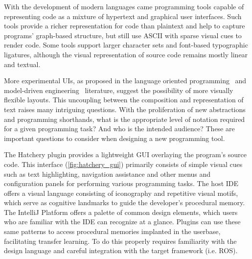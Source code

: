 With the development of modern languages came programming tools capable of representing code as a mixture of hypertext and graphical user interfaces. Such tools provide a richer representation for code than plaintext and help to capture programs' graph-based structure, but still use ASCII with sparse visual cues to render code. Some tools support larger character sets and font-based typographic ligatures, although the visual representation of source code remains mostly linear and textual.

More experimental UIs, as proposed in the language oriented programming~\citep{dmitriev2004language} and model-driven engineering~\citep{famelis2015mummint} literature, suggest the possibility of more visually flexible layouts. This uncoupling between the composition and representation of text raises many intriguing questions. With the proliferation of new abstractions and programming shorthands, what is the appropriate level of notation required for a given programming task? And who is the intended audience? These are important questions to consider when designing a new programming tool.

The Hatchery plugin provides a lightweight GUI overlaying the program's source code. This interface (\autoref{fig:hatchery_gui}) primarily consists of simple visual cues such as text highlighting, navigation assistance and other menus and configuration panels for performing various programming tasks. The host IDE offers a visual language consisting of iconography and repetitive visual motifs, which serve as cognitive landmarks to guide the developer's procedural memory. The IntelliJ Platform offers a palette of common design elements, which users who are familiar with the IDE can recognize at a glance. Plugins can use these same patterns to access procedural memories implanted in the userbase, facilitating transfer learning. To do this properly requires familiarity with the design language and careful integration with the target framework (i.e. ROS).

